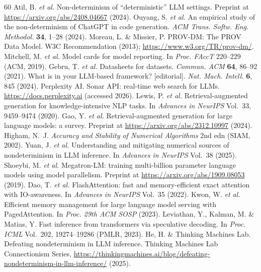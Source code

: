 \documentclass[sn-nature]{sn-jnl}
\begin{document}
\begin{thebibliography}{60}
Atil, B. \emph{et al.}
Non-determinism of ``deterministic'' LLM settings.
Preprint at \url{https://arxiv.org/abs/2408.04667} (2024).
Ouyang, S. \emph{et al.}
An empirical study of the non-determinism of ChatGPT in code generation.
\emph{ACM Trans. Softw. Eng. Methodol.} \textbf{34}, 1--28 (2024).
Moreau, L. \& Missier, P.
PROV-DM: The PROV Data Model.
W3C Recommendation (2013); \url{https://www.w3.org/TR/prov-dm/}.
Mitchell, M. \emph{et al.}
Model cards for model reporting.
In \emph{Proc. FAccT} 220--229 (ACM, 2019).
Gebru, T. \emph{et al.}
Datasheets for datasets.
\emph{Commun. ACM} \textbf{64}, 86--92 (2021).
What is in your LLM-based framework? [editorial].
\emph{Nat. Mach. Intell.} \textbf{6}, 845 (2024).
Perplexity AI.
Sonar API: real-time web search for LLMs.
\url{https://docs.perplexity.ai} (accessed 2026).
Lewis, P. \emph{et al.}
Retrieval-augmented generation for knowledge-intensive NLP tasks.
In \emph{Advances in NeurIPS} Vol.~33, 9459--9474 (2020).
Gao, Y. \emph{et al.}
Retrieval-augmented generation for large language models: a survey.
Preprint at \url{https://arxiv.org/abs/2312.10997} (2024).
Higham, N.~J.
\emph{Accuracy and Stability of Numerical Algorithms} 2nd edn (SIAM, 2002).
Yuan, J. \emph{et al.}
Understanding and mitigating numerical sources of nondeterminism in LLM inference.
In \emph{Advances in NeurIPS} Vol.~38 (2025).
Shoeybi, M. \emph{et al.}
Megatron-LM: training multi-billion parameter language models using model parallelism.
Preprint at \url{https://arxiv.org/abs/1909.08053} (2019).
Dao, T. \emph{et al.}
FlashAttention: fast and memory-efficient exact attention with IO-awareness.
In \emph{Advances in NeurIPS} Vol.~35 (2022).
Kwon, W. \emph{et al.}
Efficient memory management for large language model serving with PagedAttention.
In \emph{Proc. 29th ACM SOSP} (2023).
Leviathan, Y., Kalman, M. \& Matias, Y.
Fast inference from transformers via speculative decoding.
In \emph{Proc. ICML} Vol.~202, 19274--19286 (PMLR, 2023).
He, H. \& Thinking Machines Lab.
Defeating nondeterminism in LLM inference.
Thinking Machines Lab Connectionism Series, \url{https://thinkingmachines.ai/blog/defeating-nondeterminism-in-llm-inference/} (2025).

\end{thebibliography}
\end{document}
